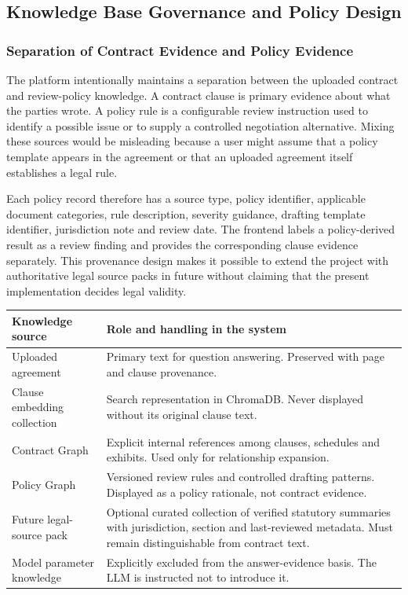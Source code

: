 \documentclass[12pt,a4paper,oneside]{report}
\begin{document}
\subsection{Knowledge Base Governance and Policy Design}

\subsubsection{Separation of Contract Evidence and Policy Evidence}
The platform intentionally maintains a separation between the uploaded contract and review-policy knowledge. A contract clause is primary evidence about what the parties wrote. A policy rule is a configurable review instruction used to identify a possible issue or to supply a controlled negotiation alternative. Mixing these sources would be misleading because a user might assume that a policy template appears in the agreement or that an uploaded agreement itself establishes a legal rule.

Each policy record therefore has a source type, policy identifier, applicable document categories, rule description, severity guidance, drafting template identifier, jurisdiction note and review date. The frontend labels a policy-derived result as a review finding and provides the corresponding clause evidence separately. This provenance design makes it possible to extend the project with authoritative legal source packs in future without claiming that the present implementation decides legal validity.

\begin{longtable}{p{}p{}}
\toprule
\textbf{Knowledge source} & \textbf{Role and handling in the system}\\
\midrule
Uploaded agreement & Primary text for question answering. Preserved with page and clause provenance.\\
Clause embedding collection & Search representation in ChromaDB. Never displayed without its original clause text.\\
Contract Graph & Explicit internal references among clauses, schedules and exhibits. Used only for relationship expansion.\\
Policy Graph & Versioned review rules and controlled drafting patterns. Displayed as a policy rationale, not contract evidence.\\
Future legal-source pack & Optional curated collection of verified statutory summaries with jurisdiction, section and last-reviewed metadata. Must remain distinguishable from contract text.\\
Model parameter knowledge & Explicitly excluded from the answer-evidence basis. The LLM is instructed not to introduce it.\\
\bottomrule
\end{longtable}
\end{document}

